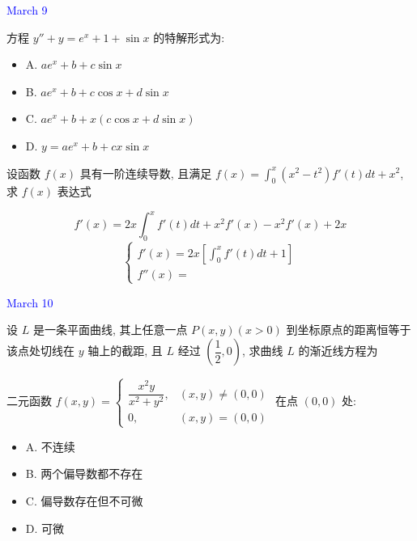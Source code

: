 \textcolor{blue}{March 9}

\begin{example}[][Exam: 29.2.3]
	方程 $y''+y=e^{x}+1+\sin x$ 的特解形式为:
\begin{itemize}
	\item A. $ae^{x}+b+c\sin x$
	\item B. $ae^{x}+b+c\cos x+d\sin x$
	\item C. $ae^{x}+b+x(c\cos x+d\sin x)$
	\item D. $y=ae^{x}+b+cx\sin x$
\end{itemize}
\end{example}
\begin{solution}

\end{solution}

\begin{example}[][Exam: 29.2.4]
	设函数 $f(x)$ 具有一阶连续导数, 且满足 $f(x)=\int_{0}^{x}(x^{2}-t^{2})f'(t)dt+x^{2}$, 求 $f(x)$ 表达式
\end{example}
\begin{solution}
	$$f'(x) = 2x\int_{0}^{x}f'(t)dt + x^{2}f'(x) - x^{2}f'(x) + 2x$$
	$$\begin{cases}
		f'(x) = 2x \left[\int_{0}^{x}f'(t)dt + 1\right]\\
		f''(x) = 
	\end{cases}$$
\end{solution}

\textcolor{blue}{March 10}

\begin{example}[][Exam: 29.2.5]
	设 $L$ 是一条平面曲线, 其上任意一点 $P(x,y)(x>0)$ 到坐标原点的距离恒等于该点处切线在 $y$ 轴上的截距, 且 $L$ 经过 $(\dfrac{1}{2},0)$, 求曲线 $L$ 的渐近线方程为
\end{example}

\begin{example}[][Exam: 29.2.6]
	二元函数 $f(x,y)=
\begin{cases}
	\dfrac{x^{2}y}{x^{2}+y^{2}},&(x,y)\neq (0,0)\\
	0,&(x,y)=(0,0)
\end{cases}$ 在点 $(0,0)$ 处:
\begin{itemize}
	\item A. 不连续
	\item B. 两个偏导数都不存在
	\item C. 偏导数存在但不可微
	\item D. 可微
\end{itemize}
\end{example}

